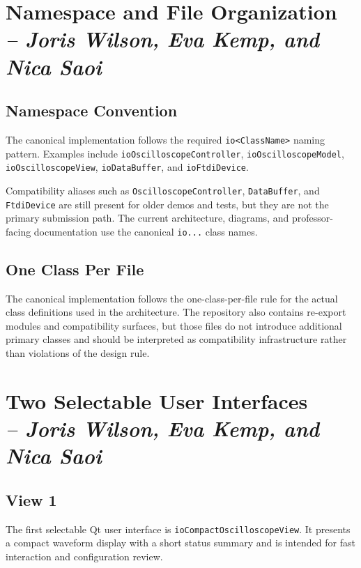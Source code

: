     \section{Namespace and File Organization \\
    \small{\textit{-- Joris Wilson, Eva Kemp, and Nica Saoi}}}
    \label{Section::Namespace and File Organization}

    \subsection{Namespace Convention}
    The canonical implementation follows the required \texttt{io<ClassName>} naming pattern. Examples include \texttt{ioOscilloscopeController}, \texttt{ioOscilloscopeModel}, \texttt{ioOscilloscopeView}, \texttt{ioDataBuffer}, and \texttt{ioFtdiDevice}.

    Compatibility aliases such as \texttt{OscilloscopeController}, \texttt{DataBuffer}, and \texttt{FtdiDevice} are still present for older demos and tests, but they are not the primary submission path. The current architecture, diagrams, and professor-facing documentation use the canonical \texttt{io...} class names.

    \subsection{One Class Per File}
    The canonical implementation follows the one-class-per-file rule for the actual class definitions used in the architecture. The repository also contains re-export modules and compatibility surfaces, but those files do not introduce additional primary classes and should be interpreted as compatibility infrastructure rather than violations of the design rule.

    \section{Two Selectable User Interfaces \\
    \small{\textit{-- Joris Wilson, Eva Kemp, and Nica Saoi}}}
    \label{Section::Two Selectable User Interfaces}

    \subsection{View 1}
    The first selectable Qt user interface is \texttt{ioCompactOscilloscopeView}. It presents a compact waveform display with a short status summary and is intended for fast interaction and configuration review.

